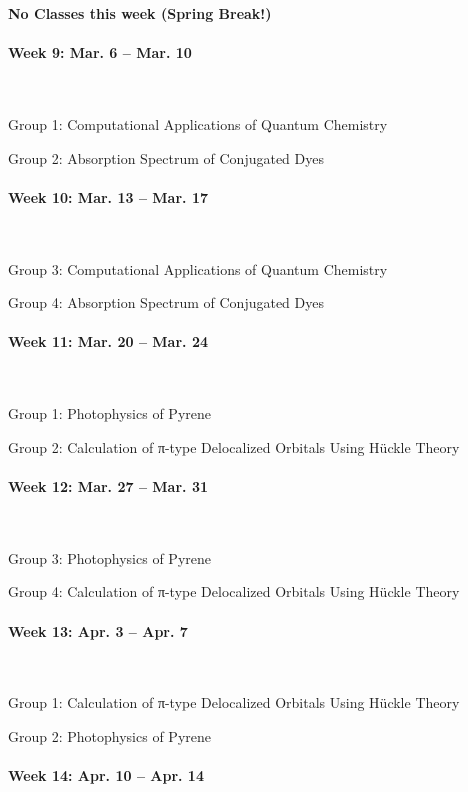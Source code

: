 \documentclass[12pt, letterpaper]{article}
\begin{document}
\textbf{No Classes this week (Spring Break!)}

\paragraph{Week 9: Mar. 6 -- Mar. 10}~

Group 1: Computational Applications of Quantum Chemistry

Group 2: Absorption Spectrum of Conjugated Dyes

\paragraph{Week 10: Mar. 13 -- Mar. 17}~

Group 3: Computational Applications of Quantum Chemistry

Group 4: Absorption Spectrum of Conjugated Dyes

\paragraph{Week 11: Mar. 20 -- Mar. 24}~

Group 1: Photophysics of Pyrene

Group 2: Calculation of π-type Delocalized Orbitals Using Hückle Theory

\paragraph{Week 12: Mar. 27 -- Mar. 31}~

Group 3: Photophysics of Pyrene

Group 4: Calculation of π-type Delocalized Orbitals Using Hückle Theory

\paragraph{Week 13: Apr. 3 -- Apr. 7}~

Group 1: Calculation of π-type Delocalized Orbitals Using Hückle Theory

Group 2: Photophysics of Pyrene

\paragraph{Week 14: Apr. 10 -- Apr. 14}~
\end{document}
